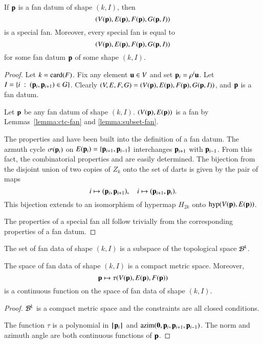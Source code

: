 \begin{lemma}
If ${\mathbf p}$ is a fan datum of shape $(k,I)$, then
$$
(V({\mathbf p}),E({\mathbf p}),F({\mathbf p}),G({\mathbf p},I))
$$
is a special fan.  Moreover, every special fan is equal to
$$
(V({\mathbf p}),E({\mathbf p}),F({\mathbf p}),G({\mathbf p},I))
$$
for some fan datum ${\mathbf p}$ of some shape $(k,I)$.
\end{lemma}

\begin{proof}
Let $k={\operatorname{card}}(F)$.  Fix any element ${\mathbf u}\in V$ and set ${\mathbf p}_i = \rho^i {\mathbf u}$.
Let $I = \{i\ :\  ({\mathbf p}_i,{\mathbf p}_{i+1}) \in G\}$.  Clearly $(V,E,F,G)=(V({\mathbf p}),E({\mathbf p}),F({\mathbf p}),G({\mathbf p},I))$, and
${\mathbf p}$ is a fan datum.

Let ${\mathbf p}$ be any fan datum of shape $(k,I)$.
$(V({\mathbf p}),E({\mathbf p}))$
is a fan by Lemmas~\ref{lemma:ctc-fan} and \ref{lemma:subset-fan}.


 The properties  and  have been built into the definition of a fan datum.  The azmuth cycle $\sigma({\mathbf p}_i)$ on $E({\mathbf p}_i) = \{{\mathbf p}_{i+1},{\mathbf p}_{i-1}\}$ interchanges ${\mathbf p}_{i+1}$ with ${\mathbf p}_{i-1}$.  From this fact, the combinatorial properties  and  are easily determined.  The bijection from the disjoint union of two copies of $Z_k$ onto the set of darts is given by the pair of maps
$$
i\mapsto ({\mathbf p}_i,{\mathbf p}_{i+1}),\quad i\mapsto ({\mathbf p}_{i+1},{\mathbf p}_i).
$$
This bijection extends to an isomorphism of hypermap $H_{2k}$ onto
${\operatorname{hyp}}(V({\mathbf p}),E({\mathbf p}))$.

 The properties of a special fan all follow trivially from the corresponding properties of a fan datum.
\end{proof}

The set of fan data of shape $(k,I)$ is a subspace of the topological space  ${\mathcal B}^k$.


\begin{lemma}
The space of fan data of shape $(k,I)$ is a compact metric space.  Moreover,
$$
{\mathbf p} \mapsto \tau(V({\mathbf p}),E({\mathbf p}),F({\mathbf p}))
$$
is a continuous function on the space of fan data of shape $(k,I)$.
\end{lemma}

\begin{proof}  ${\mathcal B}^k$ is a compact metric space and the constraints are all closed conditions.

The function $\tau$ is a polynomial in ${{\hskip0.1em|\hskip-0.15em|\hskip0.1em}{\mathbf p}_i{\hskip0.1em|\hskip-0.15em|\hskip0.1em}}$ and ${\operatorname{azim}}({\mathbf 0},{\mathbf p}_i,{\mathbf p}_{i+1},{\mathbf p}_{i-1})$.  The norm and azimuth angle are both continuous functions of ${\mathbf p}$.  
\end{proof}




